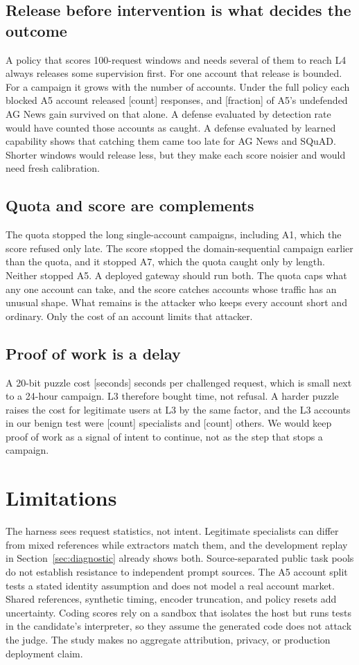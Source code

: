 \documentclass[journal]{IEEEtran}
\newcommand{\tbd}[1]{\textcolor{red!65!black}{[#1]}}
\begin{document}
\subsection{Release before intervention is what decides the outcome}
A policy that scores 100-request windows and needs several of them to reach L4 always releases some supervision first. For one account that release is bounded. For a campaign it grows with the number of accounts. Under the full policy each blocked A5 account released \tbd{count} responses, and \tbd{fraction} of A5's undefended AG News gain survived on that alone. A defense evaluated by detection rate would have counted those accounts as caught. A defense evaluated by learned capability shows that catching them came too late for AG News and SQuAD. Shorter windows would release less, but they make each score noisier and would need fresh calibration.

\subsection{Quota and score are complements}
The quota stopped the long single-account campaigns, including A1, which the score refused only late. The score stopped the domain-sequential campaign earlier than the quota, and it stopped A7, which the quota caught only by length. Neither stopped A5. A deployed gateway should run both. The quota caps what any one account can take, and the score catches accounts whose traffic has an unusual shape. What remains is the attacker who keeps every account short and ordinary. Only the cost of an account limits that attacker.

\subsection{Proof of work is a delay}
A 20-bit puzzle cost \tbd{seconds} seconds per challenged request, which is small next to a 24-hour campaign. L3 therefore bought time, not refusal. A harder puzzle raises the cost for legitimate users at L3 by the same factor, and the L3 accounts in our benign test were \tbd{count} specialists and \tbd{count} others. We would keep proof of work as a signal of intent to continue, not as the step that stops a campaign.

\section{Limitations}
\label{sec:scope}
The harness sees request statistics, not intent. Legitimate specialists can differ from mixed references while extractors match them, and the development replay in Section~\ref{sec:diagnostic} already shows both. Source-separated public task pools do not establish resistance to independent prompt sources. The A5 account split tests a stated identity assumption and does not model a real account market. Shared references, synthetic timing, encoder truncation, and policy resets add uncertainty. Coding scores rely on a sandbox that isolates the host but runs tests in the candidate's interpreter, so they assume the generated code does not attack the judge. The study makes no aggregate attribution, privacy, or production deployment claim.
\end{document}
